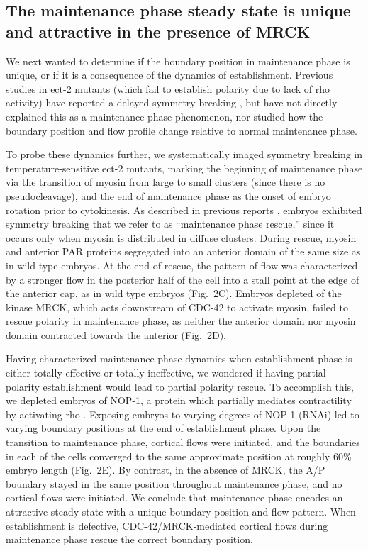 \documentclass[11pt]{article}
\newcommand{\6}[1]{#1_{\text{6}}}
\newcommand{\3}[1]{#1_{\text{3}}}
\begin{document}
\subsection*{The maintenance phase steady state is unique and attractive in the presence of MRCK}
We next wanted to determine if the boundary position in maintenance phase is unique, or if it is a consequence of the dynamics of establishment. Previous studies in ect-2 mutants (which fail to establish polarity due to lack of rho activity) have reported a delayed symmetry breaking \citep{zonies2010symmetry, tse2012rhoa}, but have not directly explained this as a maintenance-phase phenomenon, nor studied how the boundary position and flow profile change relative to normal maintenance phase. 

To probe these dynamics further, we systematically imaged symmetry breaking in temperature-sensitive ect-2 mutants, marking the beginning of maintenance phase via the transition of myosin from large to small clusters (since there is no pseudocleavage), and the end of maintenance phase as the onset of embryo rotation prior to cytokinesis. As described in previous reports \citep{zonies2010symmetry}, embryos exhibited symmetry breaking that we refer to as ``maintenance phase rescue,'' since it occurs only when myosin is distributed in diffuse clusters. During rescue, myosin and anterior PAR proteins segregated into an anterior domain of the same size as in wild-type embryos. At the end of rescue, the pattern of flow was characterized by a stronger flow in the posterior half of the cell into a stall point at the edge of the anterior cap, as in wild type embryos (Fig.\ 2C). Embryos depleted of the kinase MRCK, which acts downstream of CDC-42 to activate myosin, failed to rescue polarity in maintenance phase, as neither the anterior domain nor myosin domain contracted towards the anterior (Fig.\ 2D).

Having characterized maintenance phase dynamics when establishment phase is either totally effective or totally ineffective, we wondered if having partial polarity establishment would lead to partial polarity rescue. To accomplish this, we depleted embryos of NOP-1, a protein which partially mediates contractility by activating rho \citep{tse2012rhoa}. Exposing embryos to varying degrees of NOP-1 (RNAi) led to varying boundary positions at the end of establishment phase. Upon the transition to maintenance phase, cortical flows were initiated, and the boundaries in each of the cells converged to the same approximate position at roughly 60\% embryo length (Fig.\ 2E). By contrast, in the absence of MRCK, the A/P boundary stayed in the same position throughout maintenance phase, and no cortical flows were initiated. We conclude that maintenance phase encodes an attractive steady state with a unique boundary position and flow pattern. When establishment is defective, CDC-42/MRCK-mediated cortical flows during maintenance phase rescue the correct boundary position.
\end{document}
